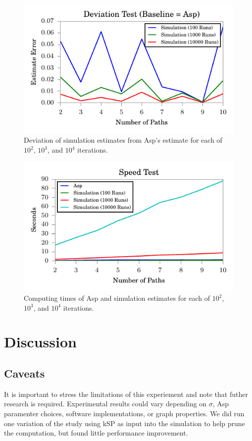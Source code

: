 \documentclass[twocolumn]{article}
\begin{document}
\begin{figure}
\centering  \includegraphics[width=\linewidth]{simulation_convergence.pdf}
  \caption{Deviation of simulation estimates from Asp's estimate for each of $10^{2}$, $10^{3}$, and $10^{4}$ iterations. }
\end{figure}


\begin{figure}
\centering  \includegraphics[width=\linewidth]{simulation_times.pdf}
  \caption{Computing times of Asp and  simulation estimates for each of $10^{2}$, $10^{3}$, and $10^{4}$ iterations. }
\end{figure}


\section{Discussion}

\subsection{Caveats}
It is important to stress the limitations of this experiement and note that futher research is required. Experimental results could vary depending on $\sigma$, Asp paramenter choices, software implementations, or graph properties. We did run one variation of the study using kSP as input into the simulation to help prune the computation, but found little performance improvement.
\end{document}
